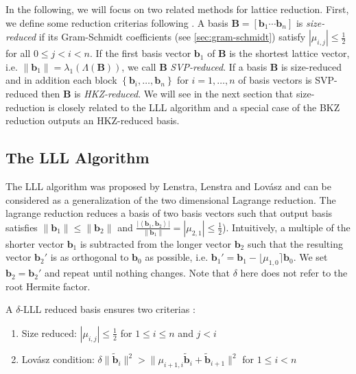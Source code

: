 In the following, we will focus on two related methods for lattice reduction. %
First, we define some reduction criterias following \cite{ABLR21}. %
A basis $\mathbf{B} = \left[\mathbf{b}_1 \cdots \mathbf{b}_n\right]$ is \textit{size-reduced} if its Gram-Schmidt coefficients (see \cref{sec:gram-schmidt}) satisfy $|\mu_{i,j}| \leq \frac{1}{2}$ for all $0\leq j < i < n$. If the first basis vector $\mathbf{b}_1$ of $\mathbf{B}$ is the shortest lattice vector, i.e. $\|\mathbf{b}_1\| = \lambda_1(\Lambda(\mathbf{B}))$, we call $\mathbf{B}$ \textit{SVP-reduced}. If a basis $\mathbf{B}$ is size-reduced and in addition each block $\left\{\mathbf{b}_i, \dots, \mathbf{b}_n\right\}$ for $i=1, \dots, n$ of basis vectors is SVP-reduced then $\mathbf{B}$ is \textit{HKZ-reduced}. We will see in the next section that size-reduction is closely related to the LLL algorithm and a special case of the BKZ reduction outputs an HKZ-reduced basis.

\subsection{The LLL Algorithm}
The LLL algorithm was proposed by Lenstra, Lenstra and Lovász \cite{LLL82} and can be considered as a generalization of the two dimensional Lagrange reduction. The lagrange reduction reduces a basis of two basis vectors such that output basis satisfies $\|\mathbf{b}_1\| \leq \|\mathbf{b}_2\|$ and $\frac{|\left\langle\mathbf{b}_1, \mathbf{b}_2\right\rangle|}{\|\mathbf{b}_1\|} = |\mu_{2,1}| \leq \frac{1}{2}$). Intuitively, a multiple of the shorter vector $\mathbf{b}_1$ is subtracted from the longer vector $\mathbf{b}_2$ such that the resulting vector $\mathbf{b}_2'$ is as orthogonal to $\mathbf{b}_0$ as possible, i.e.  $\mathbf{b}_1' =  \mathbf{b}_1 - \lfloor\mu_{1,0}\rceil \mathbf{b}_0$. We set $\mathbf{b}_2 = \mathbf{b}_2'$ and repeat until nothing changes. Note that $\delta$ here does not refer to the root Hermite factor. %

A $\delta$-LLL reduced basis ensures two criterias \cite{LLL82}:
\begin{enumerate}
  \item Size reduced: $|\mu_{i,j}| \leq \frac{1}{2}$ for $1\leq i \leq n$ and $j < i$ \label{size-red}
  \item Lovász condition: $\delta \| \tilde{\mathbf{b}}_i \|^2 > \| \mu_{i+1, i} \tilde{\mathbf{b}}_i + \tilde{\mathbf{b}}_{i+1} \|^2$ for $1\leq i < n$
\end{enumerate}

